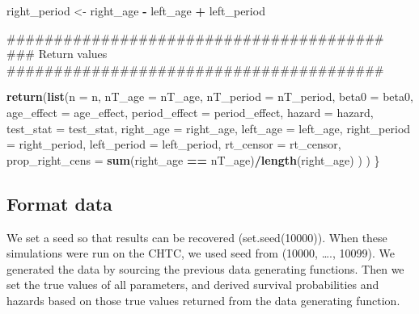 \documentclass[11pt,]{article}
\newenvironment{Shaded}{\begin{snugshade}}{\end{snugshade}}
\newcommand{\KeywordTok}[1]{\textcolor[rgb]{0.13,0.29,0.53}{\textbf{#1}}}
\newcommand{\DataTypeTok}[1]{\textcolor[rgb]{0.13,0.29,0.53}{#1}}
\newcommand{\StringTok}[1]{\textcolor[rgb]{0.31,0.60,0.02}{#1}}
\newcommand{\OperatorTok}[1]{\textcolor[rgb]{0.81,0.36,0.00}{\textbf{#1}}}
\newcommand{\NormalTok}[1]{#1}
\begin{document}
\begin{Shaded}
\begin{Highlighting}[]
\NormalTok{  right_period <-}\StringTok{ }\NormalTok{right_age }\OperatorTok{-}\StringTok{ }\NormalTok{left_age }\OperatorTok{+}\StringTok{ }\NormalTok{left_period}

\NormalTok{  ########################################}
\NormalTok{  ### Return values}
\NormalTok{  ########################################}
  
  \KeywordTok{return}\NormalTok{(}\KeywordTok{list}\NormalTok{(}\DataTypeTok{n =}\NormalTok{ n,}
              \DataTypeTok{nT_age =}\NormalTok{ nT_age,}
              \DataTypeTok{nT_period =}\NormalTok{ nT_period,}
              \DataTypeTok{beta0 =}\NormalTok{ beta0,}
              \DataTypeTok{age_effect =}\NormalTok{ age_effect,}
              \DataTypeTok{period_effect =}\NormalTok{ period_effect,}
              \DataTypeTok{hazard =}\NormalTok{ hazard,}
              \DataTypeTok{test_stat =}\NormalTok{ test_stat,}
              \DataTypeTok{right_age =}\NormalTok{ right_age,}
              \DataTypeTok{left_age =}\NormalTok{ left_age,}
              \DataTypeTok{right_period =}\NormalTok{ right_period,}
              \DataTypeTok{left_period =}\NormalTok{ left_period,}
              \DataTypeTok{rt_censor =}\NormalTok{ rt_censor,}
              \DataTypeTok{prop_right_cens =} \KeywordTok{sum}\NormalTok{(right_age }\OperatorTok{==}\StringTok{ }\NormalTok{nT_age)}\OperatorTok{/}\KeywordTok{length}\NormalTok{(right_age)}
\NormalTok{              )}
\NormalTok{  )}
\NormalTok{\}}
\end{Highlighting}
\end{Shaded}

\subsection{Format data}\label{format-data}

We set a seed so that results can be recovered (set.seed(10000)). When
these simulations were run on the CHTC, we used seed from (10000,
\ldots{}., 10099). We generated the data by sourcing the previous data
generating functions. Then we set the true values of all parameters, and
derived survival probabilities and hazards based on those true values
returned from the data generating function.
\end{document}
